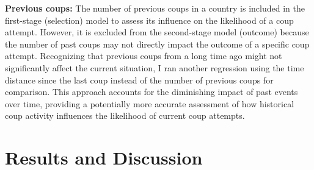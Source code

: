 \documentclass[
  12pt,
]{report}
\begin{document}
\textbf{Previous coups:} The number of previous coups in a country is
included in the first-stage (selection) model to assess its influence on
the likelihood of a coup attempt. However, it is excluded from the
second-stage model (outcome) because the number of past coups may not
directly impact the outcome of a specific coup attempt. Recognizing that
previous coups from a long time ago might not significantly affect the
current situation, I ran another regression using the time distance
since the last coup instead of the number of previous coups for
comparison. This approach accounts for the diminishing impact of past
events over time, providing a potentially more accurate assessment of
how historical coup activity influences the likelihood of current coup
attempts.

\section{Results and Discussion}\label{results-and-discussion}
\end{document}
